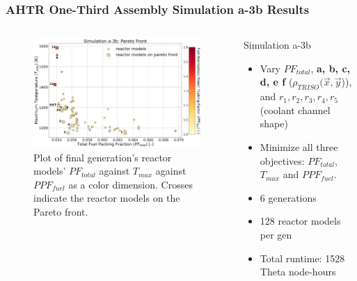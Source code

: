 \begin{frame}
    \frametitle{AHTR One-Third Assembly Simulation a-3b Results}
    \begin{columns}
    \begin{column}{0.7\textwidth}
    \begin{figure}
        \includegraphics[width=\linewidth]{../docs/figures/assem-obj-3-all-2d.png} 
        \caption{Plot of final generation's reactor models' 
        $PF_{total}$ against $T_{max}$ against $PPF_{fuel}$ as a color dimension. 
        Crosses indicate the reactor models on the Pareto front.}
    \end{figure}
    \end{column}
    \begin{column}{0.35\textwidth}
        \begin{block}{Simulation a-3b}
            \begin{itemize}
            \item Vary $PF_{total}$, \textbf{a, b, c, d, e f} ($\rho_{TRISO}(\vec{x}, 
            \vec{y}$)), and $r_1, r_2, r_3, r_4, r_5$ (coolant channel shape) 
            \item Minimize all three objectives: $PF_{total}$, $T_{max}$ and $PPF_{fuel}$.
            \item 6 generations 
            \item 128 reactor models per gen 
            \item Total runtime: 1528 Theta node-hours 
            \end{itemize}
            \end{block}
        \end{column}
\end{columns}
\end{frame}

